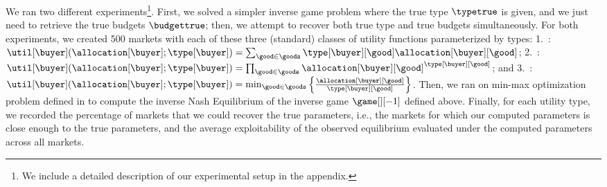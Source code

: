 We ran two different experiments\footnote{We include a detailed description of our experimental setup in the appendix.}. First, we solved a simpler inverse game problem where the true type $\typetrue$ is given, and we just need to retrieve the true budgets $\budgettrue$; then, we attempt to recover both true type and true budgets simultaneously. For both experiments, we created 500 markets with each of these three (standard) classes of utility functions parameterized by types:
1.~: $\util[\buyer](\allocation[\buyer]; \type[\buyer]) = \sum_{\good \in \goods} \type[\buyer][\good] \allocation[\buyer][\good]$; 2.~:  $\util[\buyer](\allocation[\buyer]; \type[\buyer]) = \prod_{\good \in \goods} {\allocation[\buyer][\good]}^{\type[\buyer][\good]}$; and 3.~:  $\util[\buyer](\allocation[\buyer]; \type[\buyer]) = \min_{\good \in \goods} \left\{ \frac{\allocation[\buyer][\good]}{\type[\buyer][\good]}\right\}$. 
Then, we ran  on min-max optimization problem  defined in  to compute the inverse Nash Equilibrium of the inverse game $\game[][-1]$ defined above.
Finally, for each utility type, we recorded the percentage of markets that we could recover the true parameters, i.e., the markets for which our computed parameters is close enough to the true parameters, and the average exploitability of the observed equilibrium evaluated under the computed parameters across all markets.

